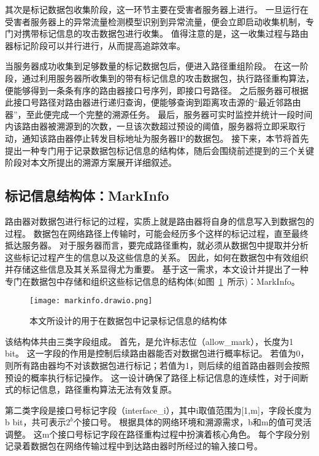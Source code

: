 其次是标记数据包收集阶段，这一环节主要在受害者服务器上进行。
一旦运行在受害者服务器上的异常流量检测模型识别到异常流量，便会立即启动收集机制，专门对携带标记信息的攻击数据包进行收集。
值得注意的是，这一收集过程与路由器标记阶段可以并行进行，从而提高追踪效率。

当服务器成功收集到足够数量的标记数据包后，便进入路径重组阶段。
在这一阶段，通过利用服务器所收集到的带有标记信息的攻击数据包，执行路径重构算法，便能够得到一条条有序的路由器接口号序列，即接口号路径。
之后服务器可根据此接口号路径对路由器进行递归查询，便能够查询到距离攻击源的“最近邻路由器”，至此便完成一个完整的溯源任务。
最后，服务器可实时监控并统计一段时间内该路由器被溯源到的次数，一旦该次数超过预设的阈值，服务器将立即采取行动，通知该路由器停止转发目标地址为服务器IP的数据包。
接下来，本节将首先提出一种专门用于记录数据包标记信息的结构体，随后会围绕前述提到的三个关键阶段对本文所提出的溯源方案展开详细叙述。
\subsection{标记信息结构体：MarkInfo}
路由器对数据包进行标记的过程，实质上就是路由器将自身的信息写入到数据包的过程。
数据包在网络路径上传输时，可能会经历多个这样的标记过程，直至最终抵达服务器。
对于服务器而言，要完成路径重构，就必须从数据包中提取并分析这些标记过程产生的信息以及这些信息的关系。
因此，如何在数据包中有效组织并存储这些信息及其关系显得尤为重要。
基于这一需求，本文设计并提出了一种专门在数据包中存储和组织这些标记信息的结构体(如图~\ref{fig:data_structure}~所示)：MarkInfo。

\begin{figure}[h]
	\centering
	\texttt{[image: markinfo.drawio.png]}
	\caption{本文所设计的用于在数据包中记录标记信息的结构体}
	\label{fig:data_structure}
\end{figure}

该结构体共由三类字段组成。
首先，是允许标志位（allow\_mark），长度为1 bit。
这一字段的作用是控制后续路由器能否对数据包进行概率标记。
若值为0，则所有路由器均不对该数据包进行标记；若值为1，则后续的组首路由器则会按照预设的概率执行标记操作。
这一设计确保了路径上标记信息的连续性，对于间断式的标记信息，路径重构算法无法有效复原。\par

第二类字段是接口号标记字段（interface\_i），其中i取值范围为[1,m]，字段长度为b bit，共可表示$2^b$个接口号。
根据具体的网络环境和溯源需求，b和m的值可灵活调整。
这m个接口号标记字段在路径重构过程中扮演着核心角色。
每个字段分别记录着数据包在网络传输过程中到达路由器时所经过的输入接口号。


